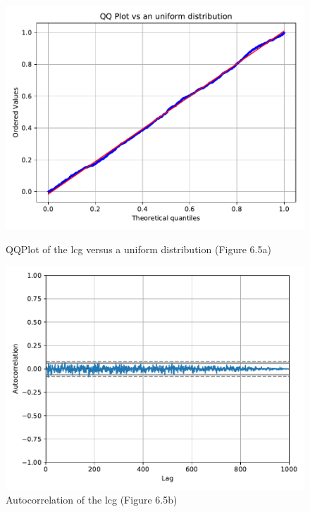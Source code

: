 \documentclass[11pt,a4paper]{article}
\begin{document}
\begin{figure}[ht]
	\centering
	\begin{minipage}{0.45\textwidth}
		\centering
		\includegraphics[width=\textwidth]{fig-6_5a}
		\caption{QQPlot of the \gls{lcg} versus a uniform distribution (Figure 6.5a)}
		\label{fig:6_5a}
	\end{minipage}
	\begin{minipage}{0.45\textwidth}
		\centering
		\includegraphics[width=\textwidth]{fig-6_5b}
		\caption{Autocorrelation of the \gls{lcg} (Figure 6.5b)}
		\label{fig:6_5b}
	\end{minipage}
\end{figure}
\end{document}
